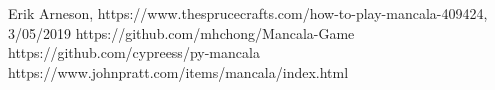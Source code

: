 \documentclass[conference]{IEEEtran}
\begin{document}

\begin{thebibliography}{00}
 Erik Arneson, https://www.thesprucecrafts.com/how-to-play-mancala-409424, 3/05/2019
 https://github.com/mhchong/Mancala-Game
 https://github.com/cypreess/py-mancala
 https://www.johnpratt.com/items/mancala/index.html
\end{thebibliography}
\end{document}
